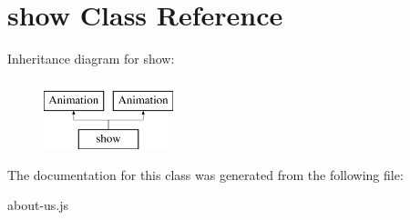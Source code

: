 \hypertarget{classshow}{\section{show Class Reference}
\label{classshow}
}
Inheritance diagram for show\-:\begin{figure}[H]
\begin{center}
\leavevmode
\includegraphics[height=2.000000cm]{classshow}
\end{center}
\end{figure}


The documentation for this class was generated from the following file\-:\begin{DoxyCompactItemize}
\item 
about-\/us.\-js\end{DoxyCompactItemize}
